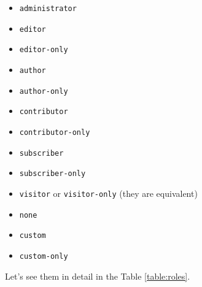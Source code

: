 \begin{itemize}
 \item \verb+administrator+
 \item \verb+editor+
 \item \verb+editor-only+
 \item \verb+author+
 \item \verb+author-only+
 \item \verb+contributor+
 \item \verb+contributor-only+
 \item \verb+subscriber+
 \item \verb+subscriber-only+
 \item \verb+visitor+ or \verb+visitor-only+ (they are equivalent)
 \item \verb+none+
 \item \verb+custom+
 \item \verb+custom-only+
\end{itemize}

Let's see them in detail in the Table \ref{table:roles}.


